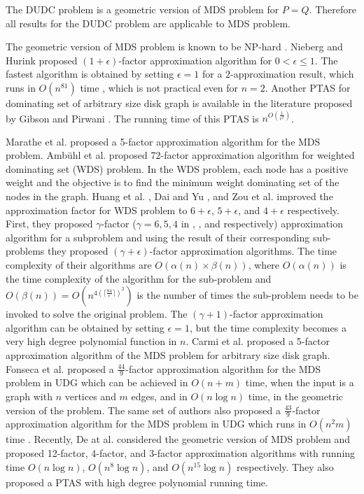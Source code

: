 \documentclass[a4paper,11pt]{article}
\begin{document}
The DUDC problem is a geometric version of MDS problem for $P=Q$. Therefore all results for the DUDC problem 
are applicable to MDS problem.

The geometric version of MDS problem is known to be NP-hard \cite{CCJ90}. 
Nieberg and Hurink \cite{NH06} proposed $(1+\epsilon)$-factor approximation algorithm 
for $0 < \epsilon \leq 1$. The fastest algorithm is obtained by setting $\epsilon = 1$ for a
$2$-approximation result, which runs in $O(n^{81})$ time \cite{DDCN13}, which is not 
practical even for $n = 2$. Another PTAS for dominating set of arbitrary size disk graph is available 
in the literature proposed by Gibson and Pirwani \cite{GP10}. The running time of this PTAS is 
$n^{O(\frac{1}{\epsilon^2})}$. 

Marathe et al. \cite{MBIRR95} proposed a 5-factor approximation algorithm for the MDS problem. 
Amb{\"u}hl et al. \cite{AEMN06} proposed 72-factor approximation algorithm for weighted dominating 
set (WDS) problem. In the WDS problem, each node has a positive weight and the objective is to find 
the minimum weight dominating set of the nodes in the graph. Huang et al. \cite{HGZW08}, Dai and Yu 
\cite{DY09}, and  Zou et al. \cite{ZWXLDWW11} improved the approximation factor for WDS problem to 
$6+\epsilon$, $5+\epsilon$, and $4+\epsilon$ respectively. First, they proposed $\gamma$-factor 
($\gamma = 6, 5, 4$ in \cite{HGZW08}, \cite{DY09}, and \cite{ZWXLDWW11} respectively) approximation 
algorithm for a subproblem and using the result of their corresponding sub-problems they proposed 
$(\gamma+\epsilon)$-factor approximation algorithms. The time complexity of their algorithms 
are $O(\alpha(n) \times \beta(n))$, where $O(\alpha(n))$ is the time complexity of the algorithm 
for the sub-problem and $O(\beta(n)) = O(n^{4 (\lceil\frac{84}{\epsilon} \rceil)^2})$ is the number 
of times the sub-problem needs to be invoked to solve the original problem. The $(\gamma + 1)$-factor 
approximation algorithm can be obtained by setting $\epsilon = 1$, but the time complexity becomes a
very high degree polynomial function in $n$. Carmi et al. \cite{CKL08} proposed a 5-factor approximation 
algorithm of the MDS problem for arbitrary size disk graph. Fonseca et al. \cite{FFSM12} proposed a 
$\frac{44}{9}$-factor approximation algorithm for the MDS problem in UDG which can be achieved in $O(n+m)$ 
time, when the input is a graph with $n$ vertices and $m$ edges, and in $O(n \log n)$ time, in the geometric 
version of the problem. The same set of authors also proposed a $\frac{43}{9}$-factor approximation algorithm 
for the MDS problem in UDG which runs in $O(n^2 m)$ time \cite{FFSM12-1}. Recently, De at al. \cite{DDCN13} 
considered the geometric version of MDS problem and proposed 12-factor, 4-factor, and 3-factor approximation 
algorithms with running time $O(n \log n)$, $O(n^8 \log n)$, and $O(n^{15}\log n)$ respectively. They also 
proposed a PTAS with high degree polynomial running time. 
\end{document}
